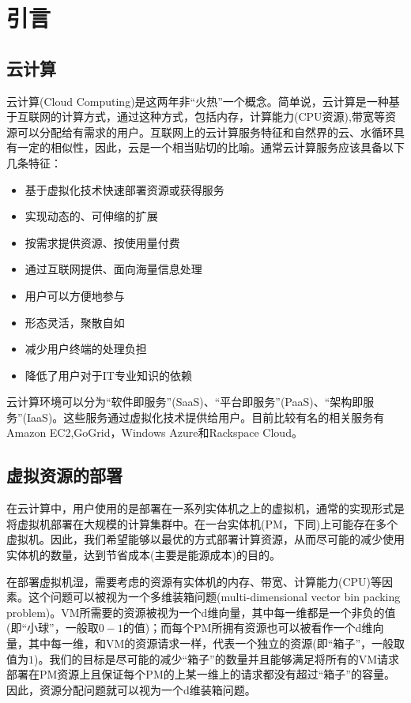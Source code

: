 
\chapter{引言}
\label{chap:1}

\section{云计算}
\label{sec:cloud-computing}

云计算(Cloud Computing)是这两年非``火热''一个概念。简单说，云计算是一种基于互联网的计算方式，通过这种方式，包括内存，计算能力(CPU资源),带宽等资源可以分配给有需求的用户。互联网上的云计算服务特征和自然界的云、水循环具有一定的相似性，因此，云是一个相当贴切的比喻。通常云计算服务应该具备以下几条特征：
\begin{itemize}
\item 基于虚拟化技术快速部署资源或获得服务
\item 实现动态的、可伸缩的扩展
\item 按需求提供资源、按使用量付费
\item 通过互联网提供、面向海量信息处理
\item 用户可以方便地参与
\item 形态灵活，聚散自如
\item 减少用户终端的处理负担
\item 降低了用户对于IT专业知识的依赖
\end{itemize}

云计算环境可以分为``软件即服务''(SaaS)、``平台即服务''(PaaS)、``架构即服务''(IaaS)。这些服务通过虚拟化技术提供给用户。目前比较有名的相关服务有Amazon EC2,GoGrid，Windows Azure和Rackspace Cloud。

\section{虚拟资源的部署}
\label{sec:virtual-machine-placement}

在云计算中，用户使用的是部署在一系列实体机之上的虚拟机，通常的实现形式是将虚拟机部署在大规模的计算集群中。在一台实体机(PM，下同)上可能存在多个虚拟机。因此，我们希望能够以最优的方式部署计算资源，从而尽可能的减少使用实体机的数量，达到节省成本(主要是能源成本)的目的。

在部署虚拟机湿，需要考虑的资源有实体机的内存、带宽、计算能力(CPU)等因素。这个问题可以被视为一个多维装箱问题(multi-dimensional vector bin packing problem)。VM所需要的资源被视为一个d维向量，其中每一维都是一个非负的值(即``小球''，一般取$0-1$的值)；而每个PM所拥有资源也可以被看作一个d维向量，其中每一维，和VM的资源请求一样，代表一个独立的资源(即``箱子''，一般取值为$1$)。我们的目标是尽可能的减少``箱子''的数量并且能够满足将所有的VM请求部署在PM资源上且保证每个PM的上某一维上的请求都没有超过``箱子''的容量。因此，资源分配问题就可以视为一个d维装箱问题。




